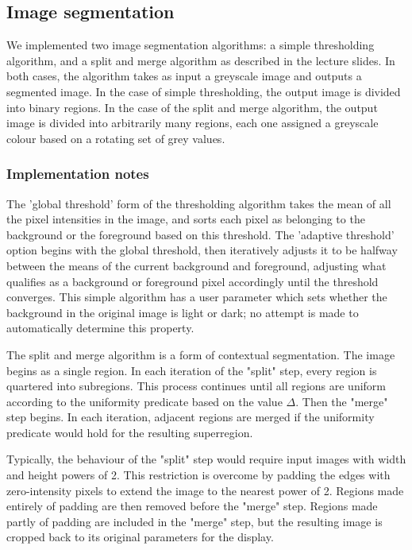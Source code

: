 \subsection{Image segmentation}
\label{sec:segmentation}

We implemented two image segmentation algorithms: a simple thresholding algorithm, and a split and merge algorithm as described in the lecture slides. In both cases, the algorithm takes as input a greyscale image and outputs a segmented image. In the case of simple thresholding, the output image is divided into binary regions. In the case of the split and merge algorithm, the output image is divided into arbitrarily many regions, each one assigned a greyscale colour based on a rotating set of grey values.

\subsubsection{Implementation notes}

The 'global threshold' form of the thresholding algorithm takes the mean of all the pixel intensities in the image, and sorts each pixel as belonging to the background or the foreground based on this threshold. The 'adaptive threshold' option begins with the global threshold, then iteratively adjusts it to be halfway between the means of the current background and foreground, adjusting what qualifies as a background or foreground pixel accordingly until the threshold converges. This simple algorithm has a user parameter which sets whether the background in the original image is light or dark; no attempt is made to automatically determine this property.

The split and merge algorithm is a form of contextual segmentation. The image begins as a single region. In each iteration of the "split" step, every region is quartered into subregions. This process continues until all regions are uniform according to the uniformity predicate based on the value $\Delta$. Then the "merge" step begins. In each iteration, adjacent regions are merged if the uniformity predicate would hold for the resulting superregion.

Typically, the behaviour of the "split" step would require input images with width and height powers of 2. This restriction is overcome by padding the edges with zero-intensity pixels to extend the image to the nearest power of 2. Regions made entirely of padding are then removed before the "merge" step. Regions made partly of padding are included in the "merge" step, but the resulting image is cropped back to its original parameters for the display.

